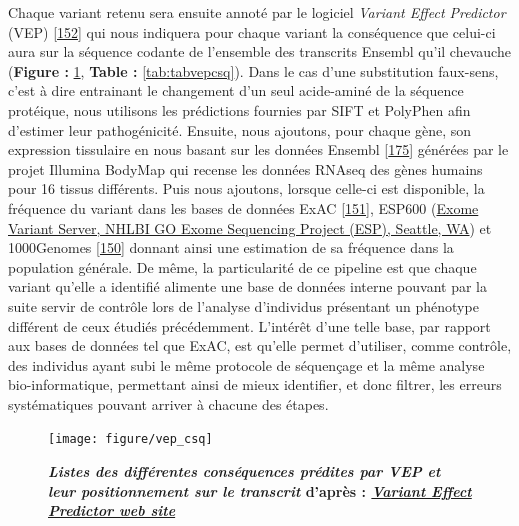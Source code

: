 \documentclass[12pt,a4paper,twoside]{ugathesis}
\theoremstyle{definition}
\theoremstyle{definition}
\theoremstyle{definition}
\theoremstyle{remark}
\begin{document}
Chaque variant retenu sera ensuite annoté par le logiciel \emph{Variant
Effect Predictor} (VEP) {[}\protect\hyperlink{ref-McLaren2016}{152}{]}
qui nous indiquera pour chaque variant la conséquence que celui-ci aura
sur la séquence codante de l'ensemble des transcrits Ensembl qu'il
chevauche (\textbf{Figure : }\ref{fig:pictvepcsq}, \textbf{Table :
}\ref{tab:tabvepcsq}). Dans le cas d'une substitution faux-sens, c'est à
dire entrainant le changement d'un seul acide-aminé de la séquence
protéique, nous utilisons les prédictions fournies par SIFT et PolyPhen
afin d'estimer leur pathogénicité. Ensuite, nous ajoutons, pour chaque
gène, son expression tissulaire en nous basant sur les données Ensembl
{[}\protect\hyperlink{ref-Aken2017}{175}{]} générées par le projet
Illumina BodyMap qui recense les données RNAseq des gènes humains pour
16 tissus différents. Puis nous ajoutons, lorsque celle-ci est
disponible, la fréquence du variant dans les bases de données ExAC
{[}\protect\hyperlink{ref-Lek2016}{151}{]}, ESP600
(\href{http://evs.gs.washington.edu/EVS/}{Exome Variant Server, NHLBI GO
Exome Sequencing Project (ESP), Seattle, WA}) et 1000Genomes
{[}\protect\hyperlink{ref-1000GenomesProjectConsortium2015}{150}{]}
donnant ainsi une estimation de sa fréquence dans la population
générale. De même, la particularité de ce pipeline est que chaque
variant qu'elle a identifié alimente une base de données interne pouvant
par la suite servir de contrôle lors de l'analyse d'individus présentant
un phénotype différent de ceux étudiés précédemment. L'intérêt d'une
telle base, par rapport aux bases de données tel que ExAC, est qu'elle
permet d'utiliser, comme contrôle, des individus ayant subi le même
protocole de séquençage et la même analyse bio-informatique, permettant
ainsi de mieux identifier, et donc filtrer, les erreurs systématiques
pouvant arriver à chacune des étapes.

\begin{figure}

{\centering \texttt{[image: figure/vep\_csq]} 

}

\caption[Listes des différentes conséquences prédites par VEP et leur positionnement sur le transcrit]{\textbf{\emph{Listes des différentes conséquences
prédites par VEP et leur positionnement sur le transcrit} d'après :
\href{http://www.ensembl.org/info/genome/variation/consequences.jpg}{\emph{Variant
Effect Predictor web site}}}}\label{fig:pictvepcsq}
\end{figure}
\end{document}
